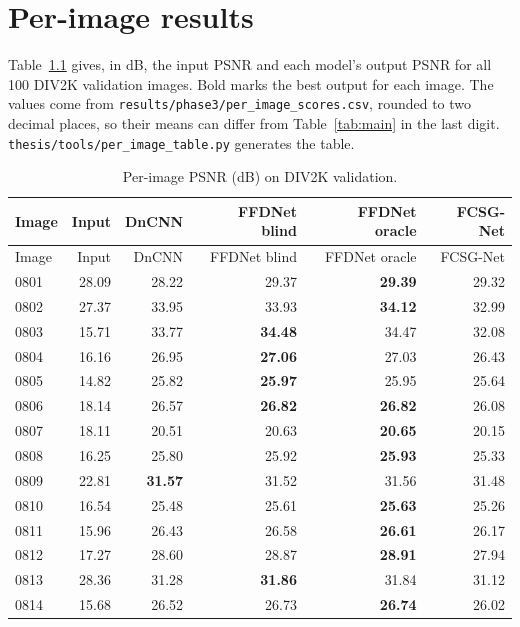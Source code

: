 \documentclass[12pt,a4paper,oneside]{NITR}
\newcommand{\fcsg}{FCSG-Net}
\begin{document}
\cleardoublepage
\chapter{Per-image results}\label{app:per-image}

Table~\ref{tab:per-image} gives, in dB, the input PSNR and each model's
output PSNR for all 100 DIV2K validation images. Bold marks the best output
for each image. The values come from
\texttt{results/phase3/per\_image\_scores.csv}, rounded to two decimal
places, so their means can differ from Table~\ref{tab:main} in the last
digit. \texttt{thesis/tools/per\_image\_table.py} generates the table.

{\small
\begin{longtable}{@{}lrrrrr@{}}
	\caption{Per-image PSNR (dB) on DIV2K validation.}\label{tab:per-image}\\
	\toprule
	Image & Input & DnCNN & FFDNet blind & FFDNet oracle & \fcsg{} \\
	\midrule
	\endfirsthead
	\toprule
	Image & Input & DnCNN & FFDNet blind & FFDNet oracle & \fcsg{} \\
	\midrule
	\endhead
	\bottomrule
	\endfoot
0801 & 28.09 & 28.22 & 29.37 & \textbf{29.39} & 29.32 \\
0802 & 27.37 & 33.95 & 33.93 & \textbf{34.12} & 32.99 \\
0803 & 15.71 & 33.77 & \textbf{34.48} & 34.47 & 32.08 \\
0804 & 16.16 & 26.95 & \textbf{27.06} & 27.03 & 26.43 \\
0805 & 14.82 & 25.82 & \textbf{25.97} & 25.95 & 25.64 \\
0806 & 18.14 & 26.57 & \textbf{26.82} & \textbf{26.82} & 26.08 \\
0807 & 18.11 & 20.51 & 20.63 & \textbf{20.65} & 20.15 \\
0808 & 16.25 & 25.80 & 25.92 & \textbf{25.93} & 25.33 \\
0809 & 22.81 & \textbf{31.57} & 31.52 & 31.56 & 31.48 \\
0810 & 16.54 & 25.48 & 25.61 & \textbf{25.63} & 25.26 \\
0811 & 15.96 & 26.43 & 26.58 & \textbf{26.61} & 26.17 \\
0812 & 17.27 & 28.60 & 28.87 & \textbf{28.91} & 27.94 \\
0813 & 28.36 & 31.28 & \textbf{31.86} & 31.84 & 31.12 \\
0814 & 15.68 & 26.52 & 26.73 & \textbf{26.74} & 26.02 \\

\end{longtable}}
\end{document}
